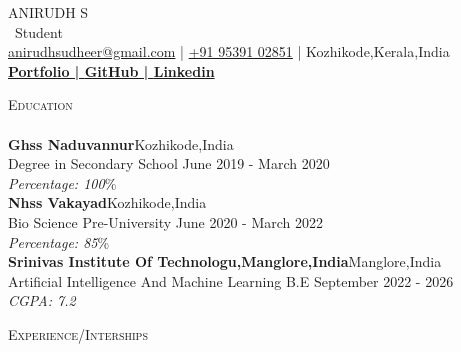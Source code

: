 \documentclass[a4paper]{article}
\newcommand{\lineunder} {
    \vspace*{-8pt} \\
    \hspace*{-18pt} \hrulefill \\
}
\newcommand{\header} [1] {
    {\hspace*{-18pt}\vspace*{6pt} \textsc{#1}}
    \vspace*{-6pt} \lineunder
}
\begin{document}
    \vspace*{-40pt}

    

%
%
  \vspace*{-2pt}
  \begin{center}
    {\Huge \scshape {ANIRUDH S}}\\
    \vspace*{2pt}
    \ {Student}\\
    \vspace*{2pt}
    \href{mailto:anirudhsudheer@gmail.com}{anirudhsudheer@gmail.com} | \href{tel:+91 95391 02851}{+91 95391 02851} | Kozhikode,Kerala,India\\
    \vspace*{2pt}
    \textbf{\href{http://bit.ly/3Du0xXP}{Portfolio | }}\textbf{\href{https://github.com/SudoAnirudh}{GitHub | }}\textbf{\href{https://www.linkedin.com/in/sudoanirudh/}{Linkedin}}\\
  \end{center}



      \header{Education}
      \vspace{2mm}
      \textbf{Ghss Naduvannur}\hfill Kozhikode,India\\
Degree in Secondary School \hfill June 2019 - March 2020\\
{\sl Percentage: 100}\%\\
\vspace{2mm}
      \textbf{Nhss Vakayad}\hfill Kozhikode,India\\
Bio Science Pre-University \hfill June 2020 - March 2022\\
{\sl Percentage: 85}\%\\
\vspace{2mm}
      \textbf{Srinivas Institute Of Technologu,Manglore,India}\hfill Manglore,India\\
Artificial Intelligence And Machine Learning B.E \hfill September 2022 - 2026\\
{\sl CGPA: 7.2}\\
\vspace{2mm}

%
%
  \header{Experience/Interships}
  \vspace{2mm}
\end{document}
